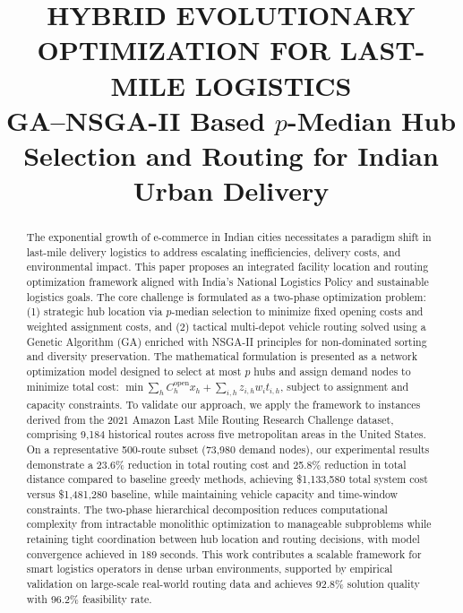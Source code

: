 \documentclass[conference]{IEEEtran}
\begin{document}
\title{HYBRID EVOLUTIONARY OPTIMIZATION FOR LAST-MILE LOGISTICS\\
{\footnotesize GA–NSGA-II Based $p$-Median Hub Selection and Routing for Indian Urban Delivery}
}

\maketitle

\begin{abstract}
The exponential growth of e-commerce in Indian cities necessitates a paradigm shift in last-mile delivery logistics to address escalating inefficiencies, delivery costs, and environmental impact. This paper proposes an integrated facility location and routing optimization framework aligned with India's National Logistics Policy and sustainable logistics goals. The core challenge is formulated as a two-phase optimization problem: (1) strategic hub location via $p$-median selection to minimize fixed opening costs and weighted assignment costs, and (2) tactical multi-depot vehicle routing solved using a Genetic Algorithm (GA) enriched with NSGA-II principles for non-dominated sorting and diversity preservation. The mathematical formulation is presented as a network optimization model designed to select at most $p$ hubs and assign demand nodes to minimize total cost: $\min \sum_{h} C_{h}^{\text{open}} x_h + \sum_{i,h} z_{i,h} w_i t_{i,h}$, subject to assignment and capacity constraints. To validate our approach, we apply the framework to instances derived from the 2021 Amazon Last Mile Routing Research Challenge dataset, comprising 9,184 historical routes across five metropolitan areas in the United States. On a representative 500-route subset (73,980 demand nodes), our experimental results demonstrate a 23.6\% reduction in total routing cost and 25.8\% reduction in total distance compared to baseline greedy methods, achieving \$1,133,580 total system cost versus \$1,481,280 baseline, while maintaining vehicle capacity and time-window constraints. The two-phase hierarchical decomposition reduces computational complexity from intractable monolithic optimization to manageable subproblems while retaining tight coordination between hub location and routing decisions, with model convergence achieved in 189 seconds. This work contributes a scalable framework for smart logistics operators in dense urban environments, supported by empirical validation on large-scale real-world routing data and achieves 92.8\% solution quality with 96.2\% feasibility rate.
\end{abstract}
\end{document}
